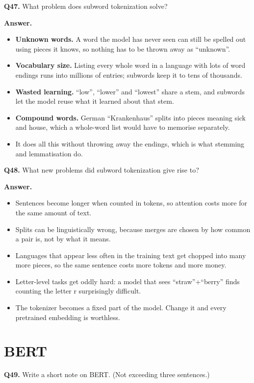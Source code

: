 \documentclass[11pt]{article}
\begin{document}
\medskip
\textbf{Q47.} What problem does subword tokenization solve?

\textbf{Answer.}
\begin{itemize}
  \item \textbf{Unknown words.} A word the model has never seen can still be spelled out using pieces it knows, so nothing has to be thrown away as ``unknown''.
  \item \textbf{Vocabulary size.} Listing every whole word in a language with lots of word endings runs into millions of entries; subwords keep it to tens of thousands.
  \item \textbf{Wasted learning.} ``low'', ``lower'' and ``lowest'' share a stem, and subwords let the model reuse what it learned about that stem.
  \item \textbf{Compound words.} German ``Krankenhaus'' splits into pieces meaning sick and house, which a whole-word list would have to memorise separately.
  \item It does all this without throwing away the endings, which is what stemming and lemmatisation do.
\end{itemize}

\medskip
\textbf{Q48.} What new problems did subword tokenization give rise to?

\textbf{Answer.}
\begin{itemize}
  \item Sentences become longer when counted in tokens, so attention costs more for the same amount of text.
  \item Splits can be linguistically wrong, because merges are chosen by how common a pair is, not by what it means.
  \item Languages that appear less often in the training text get chopped into many more pieces, so the same sentence costs more tokens and more money.
  \item Letter-level tasks get oddly hard: a model that sees ``straw''+``berry'' finds counting the letter r surprisingly difficult.
  \item The tokenizer becomes a fixed part of the model. Change it and every pretrained embedding is worthless.
\end{itemize}

\section{BERT}

\textbf{Q49.} Write a short note on BERT. (Not exceeding three sentences.)
\end{document}
